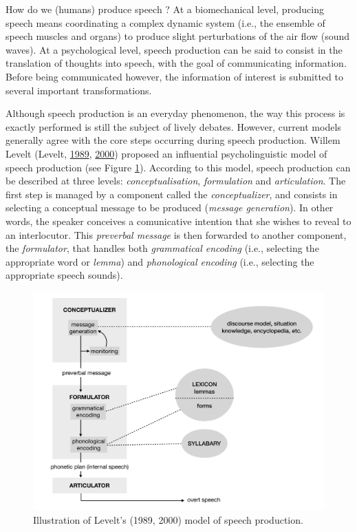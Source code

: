 \documentclass[a4paper,12pt,twoside,openright,oldfontcommands]{memoir}
\begin{document}
How do we (humans) produce speech ? At a biomechanical level, producing speech means coordinating a complex dynamic system (i.e., the ensemble of speech muscles and organs) to produce slight perturbations of the air flow (sound waves). At a psychological level, speech production can be said to consist in the translation of thoughts into speech, with the goal of communicating information. Before being communicated however, the information of interest is submitted to several important transformations.

Although speech production is an everyday phenomenon, the way this process is exactly performed is still the subject of lively debates. However, current models generally agree with the core steps occurring during speech production. Willem Levelt (Levelt, \protect\hyperlink{ref-levelt_speaking:_1989}{1989}, \protect\hyperlink{ref-brown_producing_2000}{2000}) proposed an influential psycholinguistic model of speech production (see Figure \ref{fig:levelt}). According to this model, speech production can be described at three levels: \emph{conceptualisation}, \emph{formulation} and \emph{articulation}. The first step is managed by a component called the \emph{conceptualizer}, and consists in selecting a conceptual message to be produced (\emph{message generation}). In other words, the speaker conceives a comunicative intention that she wishes to reveal to an interlocutor. This \emph{preverbal message} is then forwarded to another component, the \emph{formulator}, that handles both \emph{grammatical encoding} (i.e., selecting the appropriate word or \emph{lemma}) and \emph{phonological encoding} (i.e., selecting the appropriate speech sounds).

\begin{figure}[H]

{\centering \includegraphics[width=1\linewidth]{assets/levelt} 

}

\caption{Illustration of Levelt's (1989, 2000) model of speech production.}\label{fig:levelt}
\end{figure}
\end{document}
